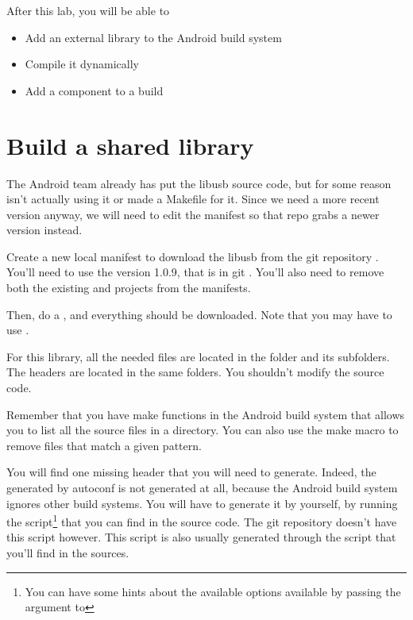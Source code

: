 
After this lab, you will be able to
\begin{itemize}
  \item Add an external library to the Android build system
  \item Compile it dynamically
  \item Add a component to a build
\end{itemize}

\section{Build a shared library}

The Android team already has put the libusb source code, but for some
reason isn't actually using it or made a Makefile for it. Since we
need a more recent version anyway, we will need to edit the manifest
so that repo grabs a newer version instead.

Create a new local manifest to download the libusb from the git
repository . You'll need to use the
version 1.0.9, that is in git . You'll also need
to remove both the existing  and 
projects from the manifests.

Then, do a , and everything should be downloaded.
Note that you may have to use .

For this library, all the needed  files are located in the
 folder and its subfolders. The headers are located in
the same folders. You shouldn't modify the  source code.

Remember that you have make functions in the Android build system that
allows you to list all the source files in a directory. You can also
use the  make macro to remove files that match a
given pattern.

You will find one missing header that you will need to
generate. Indeed, the  generated by autoconf is not
generated at all, because the Android build system ignores other build
systems. You will have to generate it by yourself, by running the
 script\footnote{You can have some hints about the
  available options available by passing the  argument to
  } that you can find in the  source
code. The git repository doesn't have this  script
however. This script is also usually generated through the
 script that you'll find in the sources.

